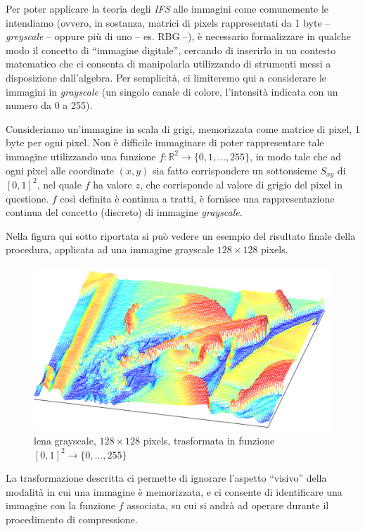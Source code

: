 \documentclass[11pt,a4paper,appendixprefix=true,numbers=noenddot]{scrreprt}
\begin{document}
Per poter applicare la teoria degli \emph{IFS} alle immagini come comunemente le intendiamo (ovvero, in sostanza, matrici di pixels rappresentati  da 1 byte -- \emph{greyscale} -- oppure più di uno -- es. RBG --), è necessario formalizzare in qualche modo il concetto di ``immagine digitale'', cercando di inserirlo in un contesto matematico che ci consenta di manipolarla utilizzando di strumenti messi a disposizione dall'algebra. Per semplicità, ci limiteremo qui a considerare le immagini in \emph{grayscale} (un singolo canale di colore, l'intensità indicata con un numero da 0 a 255).

Consideriamo un'immagine in scala di grigi, memorizzata come matrice di pixel, 1 byte per ogni pixel. Non è difficile immaginare di poter rappresentare tale immagine utilizzando una funzione $f: \mathbb{R}^2 \rightarrow  \{0, 1, \ldots, 255 \}$, in modo tale che ad ogni pixel alle coordinate $(x, y)$ sia fatto corrispondere un sottonsieme $S_{xy}$ di $[0,1]^2$, nel quale $f$ ha valore $z$, che corrisponde al valore di grigio del pixel in questione. $f$ così definita è continua a tratti, è fornisce una rappresentazione continua del concetto (discreto) di immagine \emph{grayscale}.

Nella figura qui sotto riportata si può vedere un esempio del risultato finale della procedura, applicata ad una immagine grayscale $128 \times 128$ pixels.

\begin{figure}[!ht]
\centering
\includegraphics[scale=0.6]{images/lena-mash.pdf} 
\caption{lena grayscale, $128 \times 128$ pixels, trasformata in funzione $[0,1]^2 \rightarrow \{0,\ldots,255 \}$}
\end{figure}

La trasformazione descritta ci permette di ignorare l'aspetto ``visivo'' della modalità in cui una immagine è memorizzata, e ci consente di identificare una immagine con la funzione $f$ associata, su cui si andrà ad operare durante il procedimento di compressione.
\end{document}
